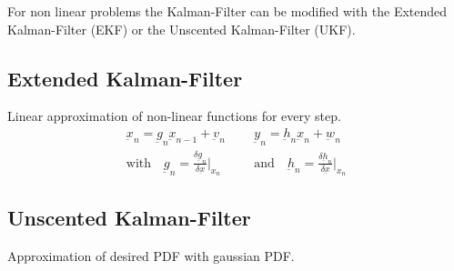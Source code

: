 \begin{mdframed}[style=eqbox]
  For non linear problems the Kalman-Filter can be modified with the Extended Kalman-Filter (EKF) or the Unscented Kalman-Filter (UKF).

  \subsection{Extended Kalman-Filter}
  Linear approximation of non-linear functions for every step.
  \vspace*{-4pt}
  \begin{align*}
    \underbar{x}_n = \underbar{g}_n \underbar{x}_{n-1} + \underbar{v}_n && \underbar{y}_n = \underbar{h}_n \underbar{x}_n + \underbar{w}_n\\
    \text{with} \quad \underbar{g}_n = \frac{\delta \underbar{g}_n}{\delta \underbar{x}} \vert_{x_{n}} \quad &&\text{and} \quad \underbar{h}_n = \frac{\delta \underbar{h}_n}{\delta \underbar{x}} \vert_{x_{n}}
  \end{align*}

  \subsection{Unscented Kalman-Filter}
  Approximation of desired PDF with gaussian PDF.\\
\end{mdframed}
